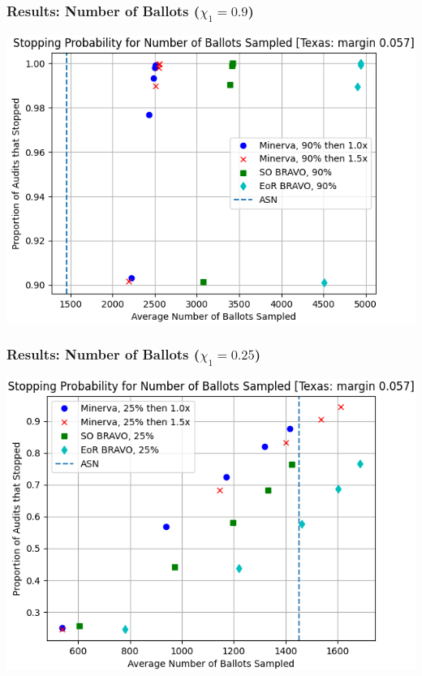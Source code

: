 \documentclass{beamer}
\begin{document}
\begin{frame}
\frametitle{Results: Number of Ballots ($\chi_1=0.9$)}
\centering

\pause 
\includegraphics[width=1\textwidth]{texas90.png}
\end{frame}

\begin{frame}
\frametitle{Results: Number of Ballots ($\chi_1=0.25$)}

\centering
\includegraphics[width=1\textwidth]{texas25.png}
\end{frame}
\end{document}
